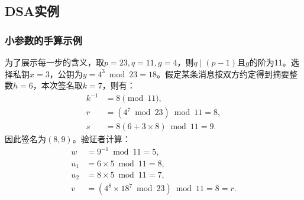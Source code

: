 \documentclass{book}
\numberwithin{equation}{subsubsection}
\begin{document}
\subsection{DSA实例}
\subsubsection{小参数的手算示例}
为了展示每一步的含义，取$p=23,q=11,g=4$，则$q\mid(p-1)$且$g$的阶为11。选择私钥$x=3$，公钥为$y=4^3\bmod23=18$。假定某条消息按双方约定得到摘要整数$h=6$，本次签名取$k=7$，则有：
\begin{equation}
    \begin{aligned}
        k^{-1}&=8\pmod{11},\\
        r&=(4^7\bmod23)\bmod11=8,\\
        s&=8(6+3\times8)\bmod11=9.
    \end{aligned}
    \nonumber
\end{equation}
因此签名为$(8,9)$。验证者计算：
\begin{equation}
    \begin{aligned}
        w&=9^{-1}\bmod11=5,\\
        u_1&=6\times5\bmod11=8,\\
        u_2&=8\times5\bmod11=7,\\
        v&=(4^8\times18^7\bmod23)\bmod11=8=r.
    \end{aligned}
    \nonumber
\end{equation}
\par
\end{document}
